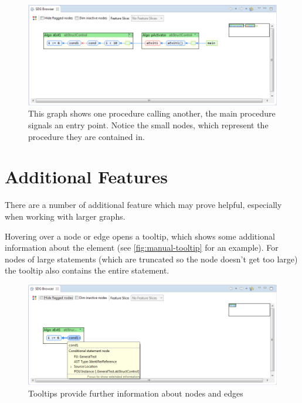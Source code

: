 \begin{figure}[hp]
  \centering
    \includegraphics[width=\textwidth]{bilder/manual-executions3}
  \caption{This graph shows one procedure calling another, the main procedure signals an entry point.
    Notice the small nodes, which represent the procedure they are contained in.}
  \label{fig:manual-executions3}
\end{figure}


\section{Additional Features} \label{sec:manual-features}

There are a number of additional feature which may prove helpful, especially when working with larger graphs.

Hovering over a node or edge opens a tooltip, which shows some additional information about the element (see 
\autoref{fig:manual-tooltip} for an example). For nodes of large statements (which are truncated so the node doesn't 
get too large) the tooltip also contains the entire statement.

\begin{figure}[hp]
  \centering
    \includegraphics[width=\textwidth]{bilder/manual-tooltip}
  \caption{Tooltips provide further information about nodes and edges}
  \label{fig:manual-tooltip}
\end{figure}

